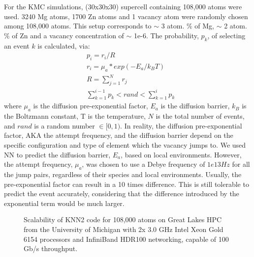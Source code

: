 For the \ac{KMC} simulations, (30x30x30) supercell containing 108,000 atoms were used. 3240 Mg atoms, 1700 Zn atoms and 1 vacancy atom were randomly chosen among 108,000 atoms. This setup corresponds to $\sim$ 3 atom. \% of Mg, $\sim$ 2 atom. \% of Zn and a vacancy concentration of $\sim$ 1e-6. The probability, $p_k$, of selecting an event $k$ is calculated, via:
\begin{subequations}
\begin{align}
& p_i = r_i / R    \label{Chap:Al/Vac:eq:prob} \\
& r_i = \mu_a * exp(- E_a / k_B T)  \label{Chap:Al/Vac:eq:rate} \\
& R = \sum_{j=1}^N r_j \label{Chap:Al/Vac:eq:R} \\
& \sum_{k=1}^{i-1} p_k < rand < \sum_{k=1}^{i} p_k \label{Chap:Al/Vac:eq:choice}
\end{align}
\end{subequations}
where $\mu_a$ is the diffusion pre-exponential factor, $E_a$ is the diffusion barrier, $k_B$ is the Boltzmann constant, T is the temperature, $N$ is the total number of events, and $rand$ is a random number $\in [0, 1)$. In reality, the diffusion pre-exponential factor, AKA the attempt frequency, and the diffusion barrier depend on the specific configuration \cite{osti_323431,van2001first,le2002kinetic} and type of element which the vacancy jumps to\cite{clouet2004nucleation}. We used \ac{NN} to predict the diffusion barrier, $E_a$, based on local environments. However, the attempt frequency, $\mu_a$, was chosen to use a Debye frequency of $1e13 Hz$ for all the jump pairs, regardless of their species and local environments. Usually, the pre-exponential factor can result in a 10 times difference. This is still tolerable to predict the event accurately, considering that the difference introduced by the exponential term would be much larger.


\begingroup
\begin{figure}[!ht]
  \centering
\caption[Scalability of KNN2 code on Great Lakes HPC.]{Scalability of KNN2 code for 108,000 atoms on Great Lakes HPC from the University of Michigan with 2x 3.0 GHz Intel Xeon Gold 6154 processors and InfiniBand HDR100 networking, capable of 100 Gb/s throughput.}
\label{Chap:Al/Vac:fig:scale}
\end{figure}
\endgroup


